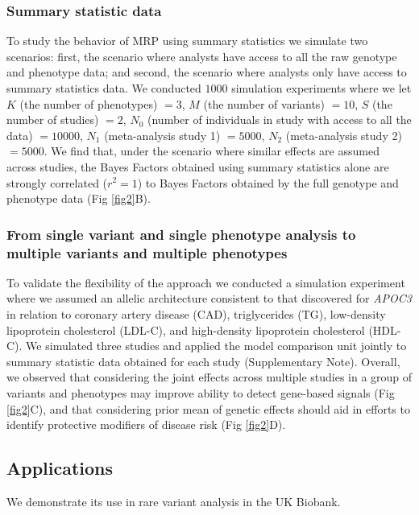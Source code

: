 \subsubsection*{Summary statistic data}
To study the behavior of MRP using summary statistics we simulate two scenarios: first, the scenario where analysts have access to all the raw genotype and phenotype data; and second, the scenario where analysts only have access to summary statistics data\cite{liu2014meta}. We conducted $1000$ simulation experiments where we let $K$ (the number of phenotypes) $=3$, $M$ (the number of variants) $=10$, $S$ (the number of studies) $=2$, $N_0$ (number of individuals in study with access to all the data) $= 10000$, $N_1$ (meta-analysis study 1) $= 5000$, $N_2$ (meta-analysis study 2) $= 5000$. We find that, under the scenario where similar effects are assumed across studies, the Bayes Factors obtained using summary statistics alone are strongly correlated ($r^2 = 1$) to Bayes Factors obtained by the full genotype and phenotype data (Fig \ref{fig2}B).

\subsubsection*{From single variant and single phenotype analysis to multiple variants and multiple phenotypes}
To validate the flexibility of the approach we conducted a simulation experiment where we assumed an allelic architecture consistent to that discovered for {\it APOC3} in relation to coronary artery disease (CAD), triglycerides (TG), low-density lipoprotein cholesterol (LDL-C), and high-density lipoprotein cholesterol (HDL-C)\cite{apoc3,apoc32,jorgensen2014loss,cohorts2014loss}. We simulated three studies and applied the model comparison unit jointly to summary statistic data obtained for each study (Supplementary Note). Overall, we observed that considering the joint effects across multiple studies in a group of variants and phenotypes may improve ability to detect gene-based signals (Fig \ref{fig2}C), and that considering prior mean of genetic effects should aid in efforts to identify protective modifiers of disease risk (Fig \ref{fig2}D).

\subsection*{Applications}
We demonstrate its use in rare variant analysis in the UK Biobank.

